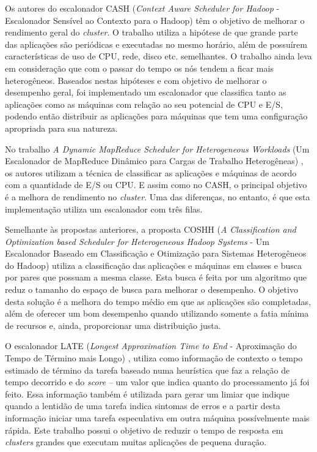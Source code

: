 Os autores do escalonador CASH (\emph{Context Aware Scheduler for Hadoop} - Escalonador Sensível ao Contexto para o Hadoop) \cite{CASH} têm o objetivo de melhorar o rendimento geral do \emph{cluster}. O trabalho utiliza a hipótese de que grande parte das aplicações são periódicas e executadas no mesmo horário, além de possuírem características de uso de CPU, rede, disco etc. semelhantes. O trabalho ainda leva em consideração que com o passar do tempo os nós tendem a ficar mais heterogêneos. Baseados nestas hipóteses e com objetivo de melhorar o desempenho geral, foi implementado um escalonador que classifica tanto as aplicações como as máquinas com relação ao seu potencial de CPU e E/S, podendo então distribuir as aplicações para máquinas que tem uma configuração apropriada para sua natureza.

No trabalho \textit{A Dynamic MapReduce Scheduler for Heterogeneous Workloads} (Um Escalonador de MapReduce Dinâmico para Cargas de Trabalho Heterogêneas) \cite{DMRSHW}, os autores utilizam a técnica de classificar as aplicações e máquinas de acordo com a quantidade de E/S ou CPU. E assim como no CASH, o principal objetivo é a melhora de rendimento no \textit{cluster}. Uma das diferenças, no entanto, é que esta implementação utiliza um escalonador com três filas.

Semelhante às propostas anteriores, a proposta COSHH (\textit{A Classification and Optimization based Scheduler for Heterogeneous Hadoop Systems} - Um Escalonador Baseado em Classificação e Otimização para Sistemas Heterogêneos do Hadoop) \cite{COSHH} utiliza a classificação das aplicações e máquinas em classes e busca por pares que possuam a mesma classe. Esta busca é feita por um algoritmo que reduz o tamanho do espaço de busca para melhorar o desempenho. O objetivo desta solução é a melhora do tempo médio em que as aplicações são completadas, além de oferecer um bom desempenho quando utilizando somente a fatia mínima de recursos e, ainda, proporcionar uma distribuição justa.

O escalonador LATE (\textit{Longest Approximation Time to End} - Aproximação do Tempo de Término mais Longo) \cite{LATE}, utiliza como informação de contexto o tempo estimado de término da tarefa baseado numa heurística que faz a relação de tempo decorrido e do \textit{score} -- um valor que indica quanto do processamento já foi feito. Essa informação também é utilizada para gerar um limiar que indique quando a lentidão de uma tarefa indica sintomas de erros e a partir desta informação iniciar uma tarefa especulativa em outra máquina possívelmente mais rápida. Este trabalho possui o objetivo de reduzir o tempo de resposta em \textit{clusters} grandes que executam muitas aplicações de pequena duração.

